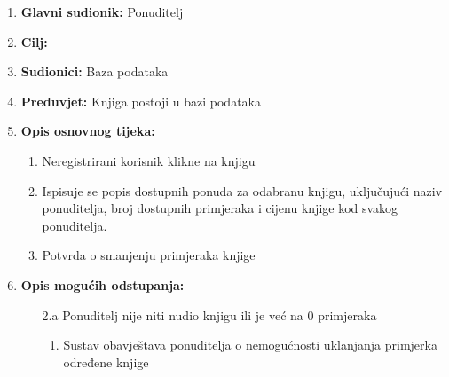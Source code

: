 \noindent {}
\begin{enumerate}
	
	\item \textbf{Glavni sudionik: } Ponuditelj
	\item  \textbf{Cilj:} 
	\item  \textbf{Sudionici:} Baza podataka
	\item  \textbf{Preduvjet:} Knjiga postoji u bazi podataka
	\item  \textbf{Opis osnovnog tijeka:}
	
	\begin{enumerate}
		
		\item Neregistrirani korisnik klikne na knjigu 
		\item Ispisuje se popis dostupnih ponuda za odabranu knjigu, uključujući naziv ponuditelja, broj dostupnih primjeraka i cijenu knjige kod svakog ponuditelja.
		\item Potvrda o smanjenju primjeraka knjige 
		
	\end{enumerate}
	
	\item  \textbf{Opis mogućih odstupanja:}
	
	\item[] \begin{enumerate}
		
		\item[2.a] Ponuditelj nije niti nudio knjigu ili je već na 0 primjeraka 
		\item[] \begin{enumerate}
			
			\item Sustav obavještava ponuditelja o nemogućnosti uklanjanja primjerka određene knjige
			
		\end{enumerate}
		
	\end{enumerate}
	
\end{enumerate}

